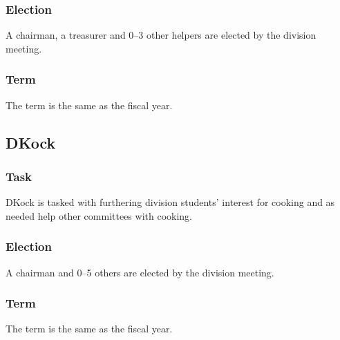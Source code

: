 \subsubsection{Election}
A chairman, a treasurer and 0--3 other helpers are elected by the division meeting. 

\subsubsection{Term}
The term is the same as the fiscal year. 

\subsection{DKock}

\subsubsection{Task}
DKock is tasked with furthering division students' interest for cooking and as needed help other committees with cooking.

\subsubsection{Election}
A chairman and 0--5 others are elected by the division meeting. 

\subsubsection{Term}
The term is the same as the fiscal year. 


\newpage
